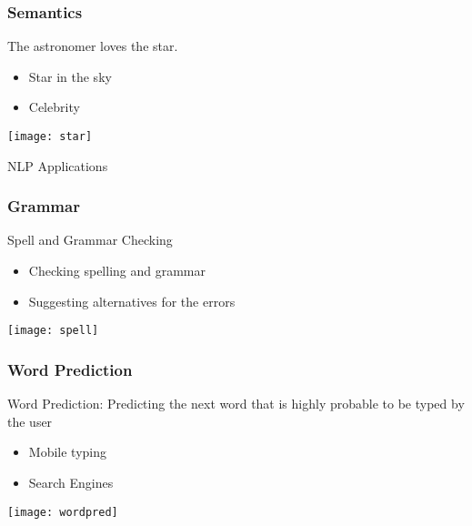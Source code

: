 \begin{frame}[fragile]\frametitle{Semantics}

The astronomer loves the star.
	\begin{itemize}
	\item Star in the sky
	\item Celebrity
	\end{itemize}

\begin{center}
\texttt{[image: star]}
\end{center}
\end{frame}

\begin{frame}
  \begin{center}
    {\Large NLP Applications}
  \end{center}
\end{frame}



\begin{frame}[fragile]\frametitle{Grammar}
Spell and Grammar Checking
	\begin{itemize}
	\item Checking spelling and grammar
	\item Suggesting alternatives for the errors
	\end{itemize}

\begin{center}
\texttt{[image: spell]}
\end{center}

\end{frame}


\begin{frame}[fragile]\frametitle{Word Prediction}
Word Prediction: Predicting the next word that is highly probable to be typed by the user
	\begin{itemize}
	\item Mobile typing
	\item Search Engines
	\end{itemize}

\begin{center}
\texttt{[image: wordpred]}
\end{center}

\end{frame}


